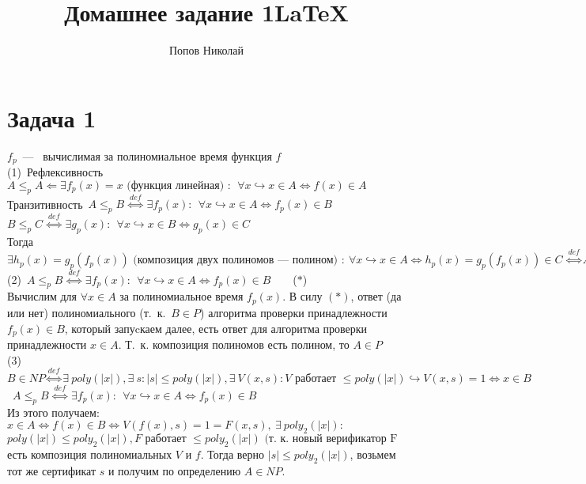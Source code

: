 \documentclass[a4paper,12pt]{article} %
\author{Попов Николай}
\title{Домашнее задание 1\LaTeX{}}
\begin{document}
\section*{Задача 1}
$f_p$~---~ вычислимая за полиномиальное время функция $f$\\ 
(1)~Рефлексивность~$ A \leq_p A \Leftarrow \exists f_p(x)=x\text{~(функция линейная)~}: ~~\forall x \hookrightarrow x \in A \Leftrightarrow f(x) \in A$\\

\noindent Транзитивность~$A \leq_p B ~\overset{def}\Leftrightarrow ~\exists f_p(x): ~~\forall x \hookrightarrow x \in A \Leftrightarrow f_p(x) \in B$\\
$B \leq_p C ~\overset{def}\Leftrightarrow ~\exists g_p(x): ~~\forall x \hookrightarrow x \in B \Leftrightarrow g_p(x) \in C$\\

Тогда
$ \exists h_p(x) = g_p(f_p(x))\text{~(композиция двух полиномов~---~полином)~}:~\forall x \hookrightarrow	x \in A \Leftrightarrow h_p(x) = g_p(f_p(x)) \in C~ \overset{def} \Leftrightarrow A \leq_p C$\\

(2)~$A \leq_p B ~\overset{def}\Leftrightarrow ~\exists f_p(x): ~~\forall x \hookrightarrow x \in A \Leftrightarrow f_p(x) \in B$~~~~($*$)\\

Вычислим для $\forall x \in A$ за полиномиальное время $f_p(x)$. В силу $ (*)$, ответ (да или нет) полиномиального (т.~к.~$B \in P$) алгоритма проверки принадлежности~$ f_p(x) \in B$, который запуcкаем далее, есть ответ для алгоритма проверки принадлежности $x \in A$. Т.~к. композиция полиномов есть полином, то $A \in P$\\
(3)~$B \in NP \overset{def}\Leftrightarrow \exists~ poly(|x|), \exists~ s : |s| 
\leq poly(|x|), \exists~ V(x,s):V \text{~работает~} 
\leq poly(|x|) \hookrightarrow V(x,s) = 1 
\Leftrightarrow x \in B $\\
~$A \leq_p B ~\overset{def}\Leftrightarrow ~\exists f_p(x): ~~\forall x \hookrightarrow x \in A \Leftrightarrow f_p(x) \in B$\\

\noindent Из этого получаем: $x \in A \Leftrightarrow f(x) \in B 
\Leftrightarrow V(f(x),s) = 1 = F(x,s),~ \exists~  poly_2(|x|): $\\ $ poly(|x|) 
\leq poly_2(|x|),F\text{~работает~}\leq poly_2(|x|) \text{~(т.~к. новый верификатор F }$ $\text{есть композиция}$
полиномиальных $V$ и $f$. Тогда верно $ |s|
\leq poly_2(|x|)$, возьмем тот же сертификат $s$ и получим по определению $A \in NP$.
\end{document}
